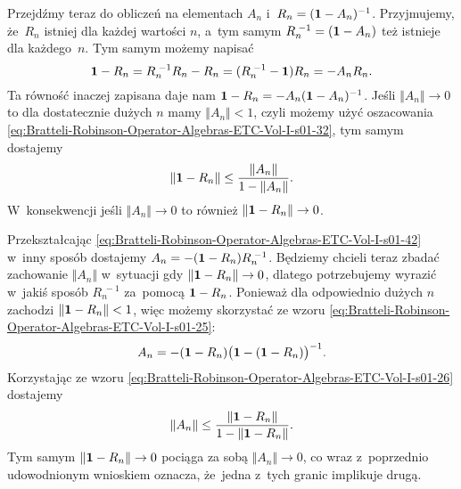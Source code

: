 \documentclass[a4paper,11pt]{article}
\numberwithin{equation}{section}
\begin{document}
Przejdźmy teraz do obliczeń na elementach $A_{ n }$
i~$R_{ n } = ( \mathbf{1} - A_{ n } )^{ -1 }$. Przyjmujemy, że~$R_{ n }$ istniej
dla każdej wartości $n$, a~tym samym
$R_{ n }^{ \; -1 } = ( \mathbf{1} - A_{ n } )$ też istnieje dla każdego~$n$. Tym
samym możemy napisać
\begin{equation}
  \label{eq:Bratteli-Robinson-Operator-Algebras-ETC-Vol-I-s01-42}
  \mathbf{1} - R_{ n } = R_{ n }^{ \; -1 } R_{ n } - R_{ n } =
  ( R_{ n }^{ \; -1 } - \mathbf{1} ) R_{ n } =
  -A_{ n } R_{ n }.
\end{equation}
Ta równość inaczej zapisana daje nam
$\mathbf{1} - R_{ n } = -A_{ n } ( \mathbf{1} - A_{ n } )^{ -1 }$. Jeśli
$\Vert A_{ n } \Vert \to 0$ to dla dostatecznie dużych $n$ mamy $\Vert A_{ n } \Vert < 1$,
czyli możemy użyć oszacowania
\eqref{eq:Bratteli-Robinson-Operator-Algebras-ETC-Vol-I-s01-32}, tym samym
dostajemy
\begin{equation}
  \label{eq:Bratteli-Robinson-Operator-Algebras-ETC-Vol-I-s01-43}
  \Vert \mathbf{1} - R_{ n } \Vert \leq
  \frac{ \Vert A_{ n } \Vert }{ 1 - \Vert A_{ n } \Vert }.
\end{equation}
W~konsekwencji jeśli $\Vert A_{ n } \Vert \to 0$ to również
$\Vert \mathbf{1} - R_{ n } \Vert \to 0$.

Przekształcając
\eqref{eq:Bratteli-Robinson-Operator-Algebras-ETC-Vol-I-s01-42} w~inny
sposób dostajemy $A_{ n } = -( \mathbf{1} - R_{ n } ) R_{ n }^{ \; -1 }$. Będziemy
chcieli teraz zbadać zachowanie $\Vert A_{ n } \Vert$ w~sytuacji gdy
$\Vert \mathbf{1} - R_{ n } \Vert \to 0$, dlatego potrzebujemy wyrazić w~jakiś sposób
$R_{ n }^{ \; - 1 }$ za~pomocą $\mathbf{1} - R_{ n }$. Ponieważ dla
odpowiednio dużych $n$ zachodzi
$\Vert \mathbf{1} - R_{ n } \Vert < 1$, więc możemy skorzystać ze wzoru
\eqref{eq:Bratteli-Robinson-Operator-Algebras-ETC-Vol-I-s01-25}:
\begin{equation}
  \label{eq:Bratteli-Robinson-Operator-Algebras-ETC-Vol-I-s01-44}
  A_{ n } =
  -( \mathbf{1} - R_{ n } )
  \big( \mathbf{1} - ( \mathbf{1} - R_{ n } ) \big)^{ -1 }.
\end{equation}
Korzystając ze wzoru
\eqref{eq:Bratteli-Robinson-Operator-Algebras-ETC-Vol-I-s01-26} dostajemy
\begin{equation}
  \label{eq:Bratteli-Robinson-Operator-Algebras-ETC-Vol-I-s01-45}
  \Vert A_{ n } \Vert \leq
  \frac{ \Vert \mathbf{1} - R_{ n } \Vert }{ 1 - \Vert \mathbf{1} - R_{ n } \Vert }.
\end{equation}
Tym samym $\Vert \mathbf{1} - R_{ n } \Vert \to 0$ pociąga za sobą $\Vert A_{ n } \Vert \to 0$, co
wraz z~poprzednio udowodnionym wnioskiem oznacza, że~jedna z~tych granic
implikuje drugą.
\end{document}
